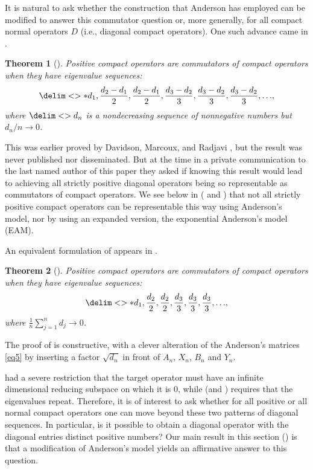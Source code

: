 \documentclass[10pt,reqno]{amsart}
\newtheorem{theorem}{Theorem}[section]
\theoremstyle{remark}
\newcommand{\seq}{\delim<>}
\numberwithin{equation}{section}
\begin{document}
It is natural to ask whether the construction that Anderson has employed can be modified to answer this commutator question or, more generally, for all compact normal operators $D$ (i.e., diagonal compact operators).
One such advance came in \cite{BPW-2014-VLOT}.

\begin{theorem}[]
  \label{t6}
  Positive compact operators are commutators of compact operators when they have eigenvalue sequences:
  \begin{equation*}
    \seq*{d_1, \dfrac{d_2-d_1}{2}, \dfrac{d_2-d_1}{2},\dfrac{d_3-d_2}{3},\dfrac{d_3-d_2}{3},\dfrac{d_3-d_2}{3},\dots},
  \end{equation*}
  where $\seq{d_n}$ is a nondecreasing sequence of nonnegative numbers but $d_n/n \to 0$.
\end{theorem}

This was earlier proved by Davidson, Marcoux, and Radjavi \cite{DMR}, but the result was never published nor disseminated.
But at the time in a private communication to the last named author of this paper they asked if knowing this result would lead to achieving all strictly positive diagonal operators being so representable as commutators of compact operators.
We see below in  ( and ) that not all strictly positive compact operators can be representable this way using Anderson's model, nor by using an expanded version, the exponential Anderson's model (EAM).

An equivalent formulation of  appears in \cite{Pat-2012}.

\begin{theorem}[]
  \label{thm3.4'}
  Positive compact operators are commutators of compact operators when
  they have eigenvalue sequences:
  \begin{equation*}
    \seq*{d_1, \dfrac{d_2}{2}, \dfrac{d_2}{2},\dfrac{d_3}{3},\dfrac{d_3}{3},\dfrac{d_3}{3},\dots},
  \end{equation*}
  where $\frac1{n}\sum_{j=1}^n d_j \to 0$.
\end{theorem}

The proof of  is constructive, with a clever alteration of the Anderson's matrices \eqref{eq5} by inserting a factor $\sqrt{d_n}$ in front of $A_n$, $X_n$, $B_n$ and $Y_n$.

 had a severe restriction that the target operator must have an infinite dimensional reducing subspace on which it is 0, while  (and ) requires that the eigenvalues repeat.
Therefore, it is of interest to ask whether for all positive or all normal compact operators one can move beyond these two patterns of diagonal sequences.
In particular, is it possible to obtain a diagonal operator with the diagonal entries distinct positive numbers?
Our main result in this section () is that a modification of Anderson's model yields an affirmative answer to this question.
\end{document}
